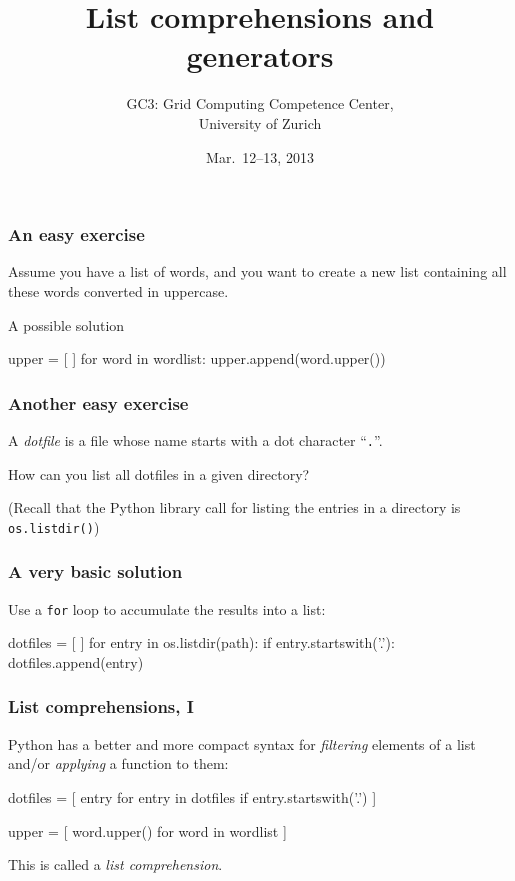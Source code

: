\documentclass[english,serif,mathserif,xcolor=pdftex,dvipsnames,table]{beamer}
\title[Part 7]{%
  List comprehensions and generators
}
\author[GC3]{%
  GC3: Grid Computing Competence Center, \\
  University of Zurich
}
\date{Mar.~12--13, 2013}
\begin{document}
\maketitle

\begin{frame}[fragile]
  \frametitle{An easy exercise}
  Assume you have a list of words, and you want to create a new list
  containing all these words converted in uppercase.

\pause
\+
A possible solution
\begin{python}
upper = [ ]
for word in wordlist:
  upper.append(word.upper())
\end{python}
\end{frame}


\begin{frame}
  \frametitle{Another easy exercise}
  A \emph{dotfile} is a file whose name starts with a dot character
  ``\texttt{.}''.

  \+
  How can you list all dotfiles in a given directory?

  \+
  (Recall that the Python library call for listing the entries in a
  directory is \texttt{os.listdir()})
\end{frame}


\begin{frame}[fragile]
  \frametitle{A very basic solution}
  Use a \lstinline|for| loop to accumulate the results into a list:
  \begin{python}
dotfiles = [ ]
for entry in os.listdir(path):
  if entry.startswith('.'):
    dotfiles.append(entry)
  \end{python}
\end{frame}


\begin{frame}[fragile]
  \frametitle{List comprehensions, I}
  Python has a better and more compact syntax for \emph{filtering} elements
  of a list and/or \emph{applying} a function to them:
  \begin{python}
dotfiles = [ entry for entry in dotfiles
             if entry.startswith('.') ]
  \end{python}
\+
\begin{python}
upper = [ word.upper() for word in wordlist ]
\end{python}

  \+
  This is called a \emph{list comprehension}.
\end{frame}
\end{document}
